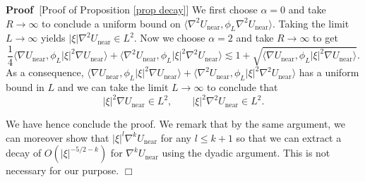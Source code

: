 \documentclass[11pt,a4paper]{article}
\numberwithin{equation}{section}
\newcommand{\tmop}[1]{\ensuremath{\operatorname{#1}}}
\newenvironment{proof}{\noindent\textbf{Proof\ }}{\hspace*{\fill}$\Box$\medskip}
\begin{document}
\begin{proof}[Proof of Proposition \ref{prop decay}]
       We first choose $\alpha=0$ and take $R\to\infty$ to conclude a uniform bound on $\langle \nabla^2
       U_{\tmop{near}},\phi_{L}\nabla^2 U_{\tmop{near}}\rangle$. Taking the limit $L\rightarrow \infty$ yields $|\xi|\nabla^2 U_{\tmop{near}}\in L^2$.
       Now we choose $\alpha=2$ and take $R\to\infty$ to get \[\frac14\langle 
       \nabla U_{\tmop{near}},\phi_{L}|\xi|^2\nabla U_{\tmop{near}}\rangle+\langle \nabla^2
       U_{\tmop{near}},\phi_{L}|\xi|^2\nabla^2 U_{\tmop{near}}\rangle\lesssim1+\sqrt{\langle 
       \nabla U_{\tmop{near}},\phi_{L}|\xi|^2\nabla U_{\tmop{near}}\rangle}.\]
       As a consequence, $\langle 
       \nabla U_{\tmop{near}},\phi_{L}|\xi|^2\nabla U_{\tmop{near}}\rangle+\langle \nabla^2
       U_{\tmop{near}},\phi_{L}|\xi|^2\nabla^2 U_{\tmop{near}}\rangle$ has a uniform bound in $L$ and we can take the limit $L\rightarrow \infty$ to conclude that \begin{equation}
       \label{Second-bound}
       |\xi|^2\nabla U_{\tmop{near}} \in L^2, \quad \quad |\xi|^2\nabla^2 U_{\tmop{near}}\in L^2.
       \end{equation}

We have hence conclude the proof.
We remark that by the same argument, we can moreover show that $|\xi|^l\nabla^k U_{\tmop{near}}$ for any $l\leqslant k+1$ so that we can extract a decay of $O(|\xi|^{-5/2-k})$ for $\nabla^k U_{\tmop{near}}$ using the dyadic argument. This is not necessary for our purpose.
\end{proof}
 

\end{document}
